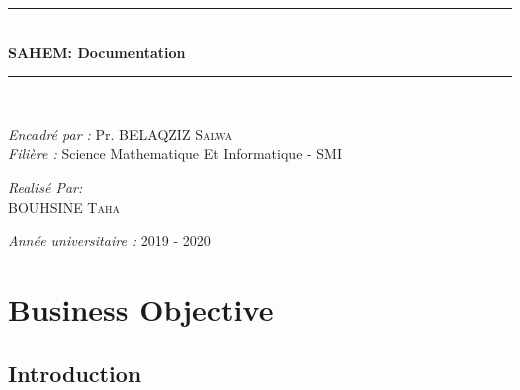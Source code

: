 \documentclass[11pt, openany]{report}
\newcommand{\HRule}{\rule{\linewidth}{0.5mm}}
\begin{document}
\begin{titlepage}
\begin{sffamily}
\begin{center}
      \HRule \\[0.4cm]
      { \huge \bfseries  SAHEM: Documentation \\[0.4cm] }

      \HRule \\[2cm]
      \begin{minipage}{0.6\textwidth}
        \begin{flushleft} \large
          \emph{Encadré par : } Pr. \textsc{BELAQZIZ Salwa}\\
          \emph{Filière : } Science Mathematique Et Informatique - SMI \\

        \end{flushleft}
      \end{minipage}
      \newline \vskip1.5cm
      \begin{minipage}{0.5\textwidth}
        \begin{center} \large
          \emph{Realisé Par:} \\
          \textsc{BOUHSINE Taha}\\

        \end{center}
      \end{minipage}
      \vskip1.5cm
      \vfill

      {\large \emph{Année universitaire : } 2019 - 2020}

    \end{center}
  \end{sffamily}
  \thispagestyle{empty}
\end{titlepage}


\clearpage





\renewcommand{\baselinestretch}{1.30}\small \normalsize

\tableofcontents
\listoffigures
\listoftables
\renewcommand{\baselinestretch}{1.18}\small \normalsize
\newpage
{}

\chapter{ Business Objective }
\section*{ Introduction }
\end{document}
